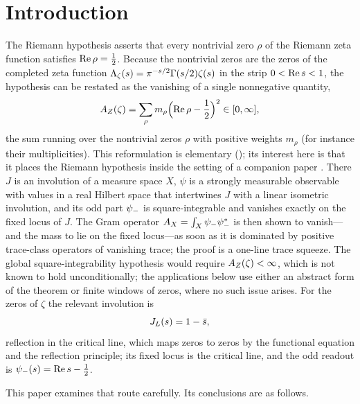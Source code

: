 \section{Introduction}
\label{sec:intro}

The Riemann hypothesis \citep{Riemann1859} asserts that every
nontrivial zero \(\rho\) of the Riemann zeta function satisfies
\(\operatorname{Re}\rho=\frac12\).  Because the nontrivial zeros are the zeros of
the completed zeta function
\(\Lambda_{\zeta}(s)=\pi^{-s/2}\Gamma(s/2)\zeta(s)\) in the strip
\(0<\operatorname{Re} s<1\), the hypothesis can be restated as the vanishing of a
single nonnegative quantity,
\[
  A_{Z}(\zeta)=\sum_{\rho}m_\rho\Bigl(\operatorname{Re}\rho-\frac12\Bigr)^2
  \in[0,\infty],
\]
the sum running over the nontrivial zeros \(\rho\) with positive
weights \(m_\rho\) (for instance their multiplicities).  This
reformulation is elementary (); its
interest here is that it places the Riemann hypothesis inside the
setting of a companion paper \citep{TsiokosSDTC2026}.  There \(J\) is
an involution of a measure space \(X\), \(\psi\) is a strongly
measurable observable with values in a real Hilbert space that
intertwines \(J\) with a linear isometric involution, and its odd part
\(\psi_{-}\) is square-integrable and vanishes exactly on the fixed locus
of \(J\).  The Gram operator \(A_{X}=\int_X\psi_{-}\psi_{-}^*\) is then shown to
vanish---and the mass to lie on the fixed locus---as soon as it is
dominated by positive trace-class operators of vanishing trace; the
proof is a one-line trace squeeze.  The global square-integrability hypothesis would require \(A_{Z}(\zeta)<\infty\),
which is not known to hold unconditionally; the
applications below use either an abstract form of the theorem or
finite windows of zeros, where no such issue arises.  For the zeros of \(\zeta\) the relevant
involution is
\[
  J_{L}(s)=1-\bar s,
\]
reflection in the critical line, which maps zeros to zeros by the
functional equation and the reflection principle; its fixed locus is
the critical line, and the odd readout is \(\psi_{-}(s)=\operatorname{Re} s-\frac12\).

This paper examines that route carefully.  Its conclusions are as
follows.

